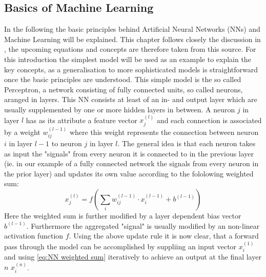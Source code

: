 \documentclass[11pt,a4paper]{article}
\begin{document}
\subsection{Basics of Machine Learning}
\label{ssec:BAsics of Machine Learning}
In the following the basic principles behind Artificial Neural Networks (NNs) and Machine Learning will be explained. 
This chapter follows closely the discussion in \cite{kubatChapter5Artificial2017}, the upcoming equations and concepts are therefore taken from this source. 
For this introduction the simplest model will be used as an example to explain the key concepts, as a generalisation to more sophisticated models is straightforward once the basic principles are understood. 
This simple model is the so called Perceptron, a network consisting of fully connected units, so called neurons, aranged in layers. 
This NN consists at least of an in- and output layer which are usually supplemented by one or more hidden layers in between. 
A neuron $j$ in layer $l$ has as its attribute a feature vector $x^{(l)}_j$ and each connection is associated by a weight $w_{ij}^{(l-1)}$ where this weight represents the connection between neuron $i$ in layer $l-1$ to neuron $j$ in layer $l$. 
The general idea is that each neuron takes as input the "signals" from every neuron it is connected to in the previous layer (ie. in our example of a fully connected network the signals from every neuron in the prior layer) and updates its own value according to the fololowing weighted sum:
\begin{equation}
    \label{eq:NN weighted sum}
    x^{(l)}_j = f\left(\sum_i w_{ij}^{(l-1)} \cdot x^{(l-1)}_i + b^{(l-1)}\right)
\end{equation}
Here the weighted sum is further modified by a layer dependent bias vector $ b^{(l-1)}$. 
Furthermore the aggregated "signal" is usually modified by an non-linear activation function $f$. 
Using the above update rule it is now clear, that a forward pass through the model can be accomplished by suppliing an input vector $x^{(1)}_i$ and using \autoref{eq:NN weighted sum} iteratively to achieve an output at the final layer $n$ $x^{(n)}_i$. \\
\end{document}
